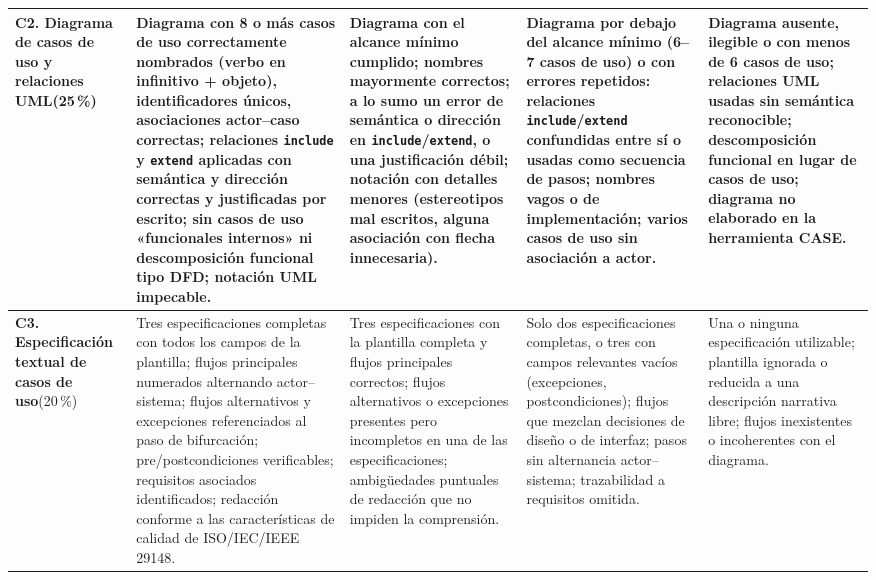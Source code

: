 \documentclass[11pt]{article}
\begin{document}
\begin{landscape}
{\begin{longtable}{|L{3.4cm}|L{4.7cm}|L{4.7cm}|L{4.7cm}|L{4.7cm}|}
\textbf{C2. Diagrama de casos de uso y relaciones UML}\newline{}(25\,\%) &
Diagrama con 8 o más casos de uso correctamente nombrados (verbo en infinitivo + objeto), identificadores únicos, asociaciones actor--caso correctas; relaciones \texttt{include} y \texttt{extend} aplicadas con semántica y dirección correctas y justificadas por escrito; sin casos de uso «funcionales internos» ni descomposición funcional tipo DFD; notación UML impecable. &
Diagrama con el alcance mínimo cumplido; nombres mayormente correctos; a lo sumo un error de semántica o dirección en \texttt{include}/\texttt{extend}, o una justificación débil; notación con detalles menores (estereotipos mal escritos, alguna asociación con flecha innecesaria). &
Diagrama por debajo del alcance mínimo (6--7 casos de uso) o con errores repetidos: relaciones \texttt{include}/\texttt{extend} confundidas entre sí o usadas como secuencia de pasos; nombres vagos o de implementación; varios casos de uso sin asociación a actor. &
Diagrama ausente, ilegible o con menos de 6 casos de uso; relaciones UML usadas sin semántica reconocible; descomposición funcional en lugar de casos de uso; diagrama no elaborado en la herramienta CASE.\\
\hline

\textbf{C3. Especificación textual de casos de uso}\newline{}(20\,\%) &
Tres especificaciones completas con todos los campos de la plantilla; flujos principales numerados alternando actor--sistema; flujos alternativos y excepciones referenciados al paso de bifurcación; pre/postcondiciones verificables; requisitos asociados identificados; redacción conforme a las características de calidad de ISO/IEC/IEEE 29148. &
Tres especificaciones con la plantilla completa y flujos principales correctos; flujos alternativos o excepciones presentes pero incompletos en una de las especificaciones; ambigüedades puntuales de redacción que no impiden la comprensión. &
Solo dos especificaciones completas, o tres con campos relevantes vacíos (excepciones, postcondiciones); flujos que mezclan decisiones de diseño o de interfaz; pasos sin alternancia actor--sistema; trazabilidad a requisitos omitida. &
Una o ninguna especificación utilizable; plantilla ignorada o reducida a una descripción narrativa libre; flujos inexistentes o incoherentes con el diagrama.\\
\hline


\end{longtable}}
\end{landscape}
\end{document}
